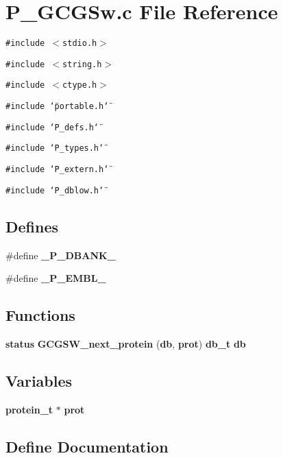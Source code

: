 \section{P\_\-GCGSw.c File Reference}
\label{P__GCGSw_8c}
{\tt \#include $<$stdio.h$>$}\par
{\tt \#include $<$string.h$>$}\par
{\tt \#include $<$ctype.h$>$}\par
{\tt \#include \char`\"{}portable.h\char`\"{}}\par
{\tt \#include \char`\"{}P\_\-defs.h\char`\"{}}\par
{\tt \#include \char`\"{}P\_\-types.h\char`\"{}}\par
{\tt \#include \char`\"{}P\_\-extern.h\char`\"{}}\par
{\tt \#include \char`\"{}P\_\-dblow.h\char`\"{}}\par
\subsection*{Defines}
\begin{CompactItemize}
\item 
\#define {\bf \_\-P\_\-DBANK\_\-}
\item 
\#define {\bf \_\-P\_\-EMBL\_\-}
\end{CompactItemize}
\subsection*{Functions}
\begin{CompactItemize}
\item 
{\bf status} {\bf GCGSW\_\-next\_\-protein} ({\bf db}, {\bf prot}) {\bf db\_\-t} {\bf db}
\end{CompactItemize}
\subsection*{Variables}
\begin{CompactItemize}
\item 
{\bf protein\_\-t} $\ast$ {\bf prot}
\end{CompactItemize}


\subsection{Define Documentation}
